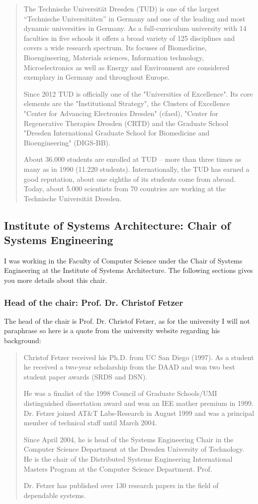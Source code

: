 \documentclass[a4paper,11pt]{report}
\begin{document}
\blockquote{The Technische Universität Dresden (TUD) is one of the largest “Technische Universitäten” in Germany and one of the leading and most dynamic universities in Germany. As a full-curriculum university with 14 faculties in five schools it offers a broad variety of 125 disciplines and covers a wide research spectrum. Its focuses of Biomedicine, Bioengineering, Materials sciences, Information technology, Microelectronics as well as Energy and Environment are considered exemplary in Germany and throughout Europe.

Since 2012 TUD is officially one of the "Universities of Excellence". Its core elements are the "Institutional Strategy", the Clusters of Excellence "Center for Advancing Electronics Dresden" (cfaed), "Center for Regenerative Therapies Dresden (CRTD) and the Graduate School "Dresden International Graduate School for Biomedicine and Bioengineering" (DIGS-BB).

About 36.000 students are enrolled at TUD – more than three times as many as in 1990 (11.220 students). Internationally, the TUD has earned a good reputation, about one eighths of its students come from abroad. Today, about 5.000 scientists from 70 countries are working at the Technische Universität Dresden.}

\subsection{Institute of Systems Architecture: Chair of Systems Engineering}

I was working in the Faculty of Computer Science under the Chair of Systems Engineering at the Institute of Systems Architecture. The following sections gives you more details about this chair.

\subsubsection{Head of the chair: Prof. Dr. Christof Fetzer}

The head of the chair is Prof. Dr. Christof Fetzer, as for the university I will not paraphrase so here is a quote from the university website \cite{tud:chair:head} regarding his background:

\blockquote{Christof Fetzer received his Ph.D. from UC San Diego (1997). 
As a student he received a two-year scholarship from the DAAD and won two best student paper awards (SRDS and DSN). 

He was a finalist of the 1998 Council of Graduate Schools/UMI distinguished dissertation award and won an IEE mather premium in 1999. Dr. Fetzer joined AT\&T Labs-Research in August 1999 and was a principal member of technical staff until March 2004. 

Since April 2004, he is head of the Systems Engineering Chair in the Computer Science Department at the Dresden University of Technology. He is the chair of the Distributed Systems Engineering International Masters Program at the Computer Science Department. Prof. 

Dr. Fetzer has published over 130 research papers in the field of dependable systems.}
 
\end{document}
